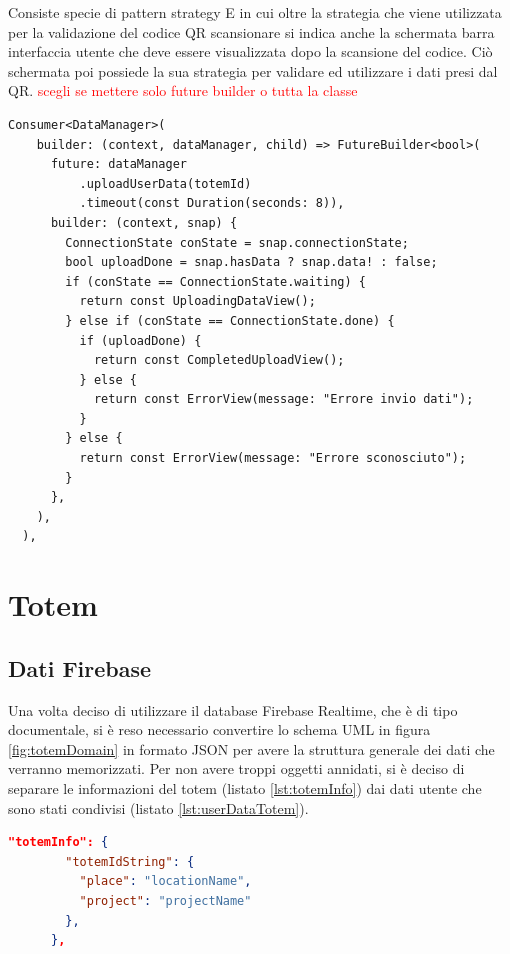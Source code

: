 Consiste specie di pattern strategy E in cui oltre la strategia che viene utilizzata per la validazione del codice QR scansionare si indica anche la schermata barra interfaccia utente che deve essere visualizzata dopo la scansione del codice. Ciò schermata poi possiede la sua strategia per validare ed utilizzare i dati presi dal QR.
\textcolor{red}{scegli se mettere solo future builder o tutta la classe}

 \begin{lstlisting}[style=FlutterStyle, caption={}, label={lst:strategyViewTotem}]
  Consumer<DataManager>(
    builder: (context, dataManager, child) => FutureBuilder<bool>(
      future: dataManager
          .uploadUserData(totemId)
          .timeout(const Duration(seconds: 8)),
      builder: (context, snap) {
        ConnectionState conState = snap.connectionState;
        bool uploadDone = snap.hasData ? snap.data! : false;
        if (conState == ConnectionState.waiting) {
          return const UploadingDataView();
        } else if (conState == ConnectionState.done) {
          if (uploadDone) {
            return const CompletedUploadView();
          } else {
            return const ErrorView(message: "Errore invio dati");
          }
        } else {
          return const ErrorView(message: "Errore sconosciuto");
        }
      },
    ),
  ),
\end{lstlisting}
\section{Totem}
\subsection{Dati Firebase}
Una volta deciso di utilizzare il database Firebase Realtime, che è di tipo documentale, si è reso necessario convertire lo schema UML in figura \ref{fig:totemDomain} in formato JSON per avere la struttura generale dei dati che verranno memorizzati.
Per non avere troppi oggetti annidati, si è deciso di separare le informazioni del totem (listato \ref{lst:totemInfo}) dai dati utente che sono stati condivisi (listato \ref{lst:userDataTotem}).

\begin{lstlisting}[language=json, caption={Esempio di oggetto JSON contenente le informazioni sui totem}, label={lst:totemInfo}]
    "totemInfo": {
        "totemIdString": {
          "place": "locationName",
          "project": "projectName"
        },
      },
\end{lstlisting}  

